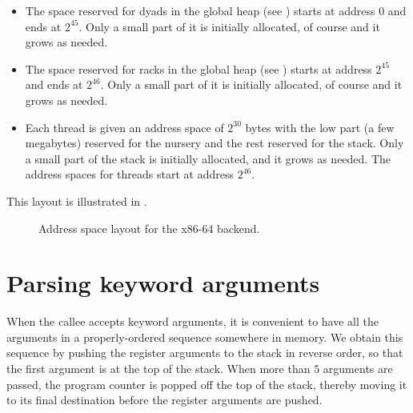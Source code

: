 \begin{itemize}
\item The space reserved for dyads in the global heap (see
  ) starts at address $0$ and ends at
  $2^{45}$.  Only a small part of it is initially allocated, of course
  and it grows as needed.
\item The space reserved for racks in the global heap (see
  ) starts at address $2^{45}$ and ends at
  $2^{46}$.  Only a small part of it is initially allocated, of course
  and it grows as needed.
\item Each thread is given an address space of $2^{30}$ bytes with the
  low part (a few megabytes) reserved for the nursery and the rest
  reserved for the stack.  Only a small part of the stack is initially
  allocated, and it grows as needed.  The address spaces for threads
  start at address $2^{46}$.
\end{itemize}

This layout is illustrated in .

\begin{figure}
\begin{center}
\end{center}
\caption{\label{fig-address-space-x86-64}
Address space layout for the x86-64 backend.}
\end{figure}

\section{Parsing keyword arguments}

When the callee accepts keyword arguments, it is convenient to have
all the arguments in a properly-ordered sequence somewhere in memory.
We obtain this sequence by pushing the register arguments to the stack
in reverse order, so that the first argument is at the top of the
stack.  When more than $5$ arguments are passed, the program counter
is popped off the top of the stack, thereby moving it to its final
destination before the register arguments are pushed.

